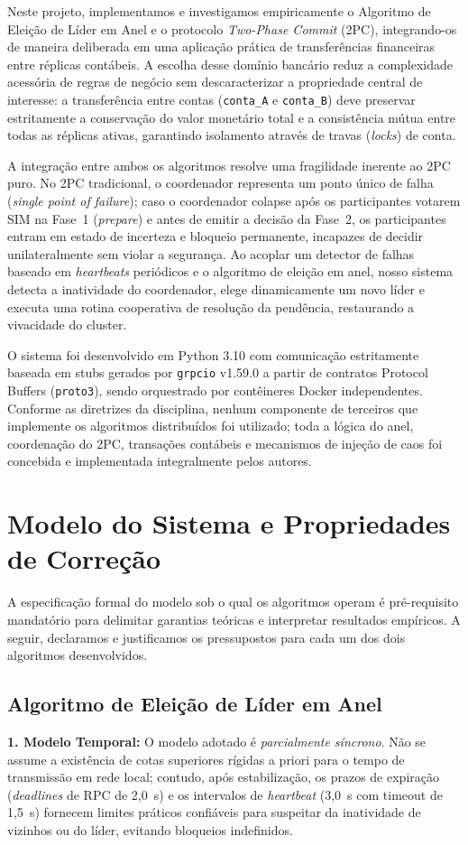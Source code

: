 \documentclass[conference]{IEEEtran}
\begin{document}
Neste projeto, implementamos e investigamos empiricamente o Algoritmo de Eleição de Líder em Anel e o protocolo \textit{Two-Phase Commit} (2PC), integrando-os de maneira deliberada em uma aplicação prática de transferências financeiras entre réplicas contábeis. A escolha desse domínio bancário reduz a complexidade acessória de regras de negócio sem descaracterizar a propriedade central de interesse: a transferência entre contas (\texttt{conta\_A} e \texttt{conta\_B}) deve preservar estritamente a conservação do valor monetário total e a consistência mútua entre todas as réplicas ativas, garantindo isolamento através de travas (\textit{locks}) de conta.

A integração entre ambos os algoritmos resolve uma fragilidade inerente ao 2PC puro. No 2PC tradicional, o coordenador representa um ponto único de falha (\textit{single point of failure}); caso o coordenador colapse após os participantes votarem SIM na Fase~1 (\textit{prepare}) e antes de emitir a decisão da Fase~2, os participantes entram em estado de incerteza e bloqueio permanente, incapazes de decidir unilateralmente sem violar a segurança. Ao acoplar um detector de falhas baseado em \textit{heartbeats} periódicos e o algoritmo de eleição em anel, nosso sistema detecta a inatividade do coordenador, elege dinamicamente um novo líder e executa uma rotina cooperativa de resolução da pendência, restaurando a vivacidade do cluster.

O sistema foi desenvolvido em Python 3.10 com comunicação estritamente baseada em stubs gerados por \texttt{grpcio} v1.59.0 a partir de contratos Protocol Buffers (\texttt{proto3}), sendo orquestrado por contêineres Docker independentes. Conforme as diretrizes da disciplina, nenhum componente de terceiros que implemente os algoritmos distribuídos foi utilizado; toda a lógica do anel, coordenação do 2PC, transações contábeis e mecanismos de injeção de caos foi concebida e implementada integralmente pelos autores.

\section{Modelo do Sistema e Propriedades de Correção}
A especificação formal do modelo sob o qual os algoritmos operam é pré-requisito mandatório para delimitar garantias teóricas e interpretar resultados empíricos. A seguir, declaramos e justificamos os pressupostos para cada um dos dois algoritmos desenvolvidos.

\subsection{Algoritmo de Eleição de Líder em Anel}
\textbf{1. Modelo Temporal:} O modelo adotado é \textit{parcialmente síncrono}. Não se assume a existência de cotas superiores rígidas a priori para o tempo de transmissão em rede local; contudo, após estabilização, os prazos de expiração (\textit{deadlines} de RPC de 2,0~s) e os intervalos de \textit{heartbeat} (3,0~s com timeout de 1,5~s) fornecem limites práticos confiáveis para suspeitar da inatividade de vizinhos ou do líder, evitando bloqueios indefinidos.
\end{document}
